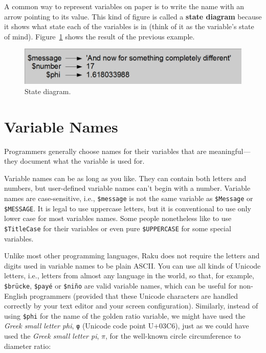 A common way to represent variables on paper is to write the name with
an arrow pointing to its value.  This kind of figure is
called a {\bf state diagram} because it shows what state each of the
variables is in (think of it as the variable's state of mind).
Figure~\ref{fig.state2} shows the result of the previous example.

\begin{figure}
\centerline
{\includegraphics[scale=0.6]{figs/test_5.png}}
\caption{State diagram.}
\label{fig.state2}
\end{figure}



\section{Variable Names}

Programmers generally choose names for their variables that
are meaningful---they document what the variable is used for.

Variable names can be as long as you like.  They can contain
both letters and numbers, but user-defined variable names 
can't begin with a number. Variable names are case-sensitive, 
i.e., {\tt \$message} is not the same variable as {\tt \$Message} 
or {\tt \$MESSAGE}. It is legal to use uppercase letters, but 
it is conventional to use only lower case for most variables 
names. Some people nonetheless like to use {\tt \$TitleCase} 
for their variables or even pure {\tt \$UPPERCASE} for 
some special variables.


Unlike most other programming languages, Raku does not require 
the letters and digits used in variable names to be plain ASCII. 
You can use all kinds of Unicode letters, i.e., 
letters from almost any language in the world, so that, for example,  
{\tt \$brücke}, {\tt \$payé} or {\tt \$niño} are 
valid variable names, which can be useful for non-English 
programmers (provided that these Unicode characters are 
handled correctly by your text editor and your 
screen configuration). Similarly, instead of using 
\verb"$phi" for the name of the golden ratio variable, 
we might have used the \emph{Greek small letter phi}, \verb'φ' 
(Unicode code point U+03C6), just as we could have used 
the \emph{Greek small letter pi}, $\pi$,  for the well-known 
circle circumference to diameter ratio:

